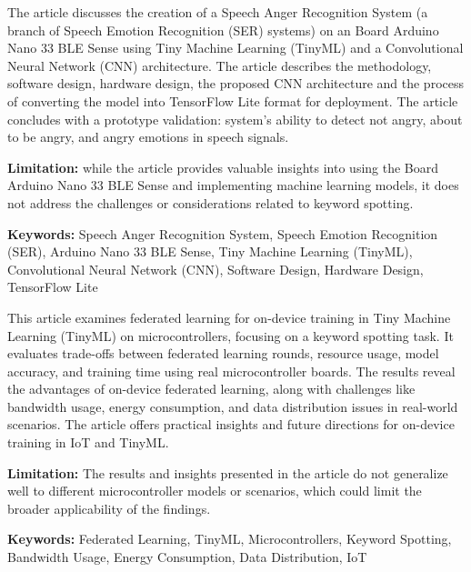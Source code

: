 %
%
%
%



{ 
	The article \cite{Waqar:2021} discusses the creation of a Speech Anger Recognition System (a branch of Speech Emotion Recognition (SER) systems) on an Board Arduino Nano 33 BLE Sense using Tiny Machine Learning (TinyML) and a Convolutional Neural Network (CNN) architecture. The article describes the methodology, software design, hardware design, the proposed CNN architecture and the process of converting the model into TensorFlow Lite format for deployment. The article concludes with a prototype validation: system's ability to detect not angry, about to be angry, and angry emotions in speech signals.
	
	\bigskip
	
	\textbf{Limitation:} while the article provides valuable insights into using the Board Arduino Nano 33 BLE Sense and implementing machine learning models, it does not address the challenges or considerations related to keyword spotting.
	
	\scriptsize{\textbf{Keywords:} Speech Anger Recognition System, Speech Emotion Recognition (SER), Arduino Nano 33 BLE Sense, Tiny Machine Learning (TinyML), Convolutional Neural Network (CNN), Software Design, Hardware Design, TensorFlow Lite}
}


{ 
	This article \cite{Gimenez:2022a} examines federated learning for on-device training in Tiny Machine Learning (TinyML) on microcontrollers, focusing on a keyword spotting task. It evaluates trade-offs between federated learning rounds, resource usage, model accuracy, and training time using real microcontroller boards. The results reveal the advantages of on-device federated learning, along with challenges like bandwidth usage, energy consumption, and data distribution issues in real-world scenarios. The article offers practical insights and future directions for on-device training in IoT and TinyML.
	
	\bigskip
	
	\textbf{Limitation:} The results and insights presented in the article do not generalize well to different microcontroller models or scenarios, which could limit the broader applicability of the findings. 
	
	\scriptsize{\textbf{Keywords:} Federated Learning, TinyML, Microcontrollers, Keyword Spotting, Bandwidth Usage, Energy Consumption, Data Distribution, IoT}
}


